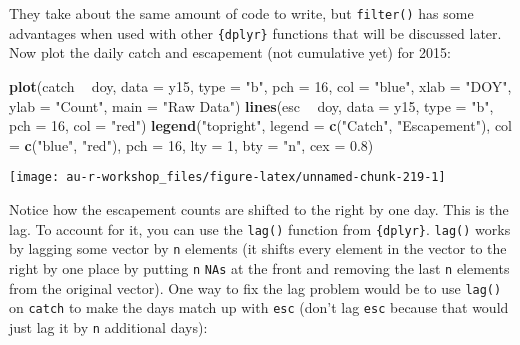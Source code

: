 \documentclass[]{book}
\newenvironment{Shaded}{\begin{snugshade}}{\end{snugshade}}
\newcommand{\KeywordTok}[1]{\textcolor[rgb]{0.13,0.29,0.53}{\textbf{#1}}}
\newcommand{\DataTypeTok}[1]{\textcolor[rgb]{0.13,0.29,0.53}{#1}}
\newcommand{\DecValTok}[1]{\textcolor[rgb]{0.00,0.00,0.81}{#1}}
\newcommand{\FloatTok}[1]{\textcolor[rgb]{0.00,0.00,0.81}{#1}}
\newcommand{\StringTok}[1]{\textcolor[rgb]{0.31,0.60,0.02}{#1}}
\newcommand{\OperatorTok}[1]{\textcolor[rgb]{0.81,0.36,0.00}{\textbf{#1}}}
\newcommand{\NormalTok}[1]{#1}
\theoremstyle{definition}
\theoremstyle{definition}
\theoremstyle{definition}
\theoremstyle{remark}
\begin{document}
They take about the same amount of code to write, but \texttt{filter()}
has some advantages when used with other \texttt{\{dplyr\}} functions
that will be discussed later. Now plot the daily catch and escapement
(not cumulative yet) for 2015:

\begin{Shaded}
\begin{Highlighting}[]
\KeywordTok{plot}\NormalTok{(catch }\OperatorTok{~}\StringTok{ }\NormalTok{doy, }\DataTypeTok{data =}\NormalTok{ y15, }\DataTypeTok{type =} \StringTok{"b"}\NormalTok{, }\DataTypeTok{pch =} \DecValTok{16}\NormalTok{, }\DataTypeTok{col =} \StringTok{"blue"}\NormalTok{,}
     \DataTypeTok{xlab =} \StringTok{"DOY"}\NormalTok{, }\DataTypeTok{ylab =} \StringTok{"Count"}\NormalTok{, }\DataTypeTok{main =} \StringTok{"Raw Data"}\NormalTok{)}
\KeywordTok{lines}\NormalTok{(esc }\OperatorTok{~}\StringTok{ }\NormalTok{doy, }\DataTypeTok{data =}\NormalTok{ y15, }\DataTypeTok{type =} \StringTok{"b"}\NormalTok{, }\DataTypeTok{pch =} \DecValTok{16}\NormalTok{, }\DataTypeTok{col =} \StringTok{"red"}\NormalTok{)}
\KeywordTok{legend}\NormalTok{(}\StringTok{"topright"}\NormalTok{, }\DataTypeTok{legend =} \KeywordTok{c}\NormalTok{(}\StringTok{"Catch"}\NormalTok{, }\StringTok{"Escapement"}\NormalTok{), }
       \DataTypeTok{col =} \KeywordTok{c}\NormalTok{(}\StringTok{"blue"}\NormalTok{, }\StringTok{"red"}\NormalTok{), }\DataTypeTok{pch =} \DecValTok{16}\NormalTok{, }\DataTypeTok{lty =} \DecValTok{1}\NormalTok{, }\DataTypeTok{bty =} \StringTok{"n"}\NormalTok{, }\DataTypeTok{cex =} \FloatTok{0.8}\NormalTok{)}
\end{Highlighting}
\end{Shaded}

\begin{center}\texttt{[image: au-r-workshop\_files/figure-latex/unnamed-chunk-219-1]} \end{center}

Notice how the escapement counts are shifted to the right by one day.
This is the lag. To account for it, you can use the \texttt{lag()}
function from \texttt{\{dplyr\}}. \texttt{lag()} works by lagging some
vector by \texttt{n} elements (it shifts every element in the vector to
the right by one place by putting \texttt{n} \texttt{NAs} at the front
and removing the last \texttt{n} elements from the original vector). One
way to fix the lag problem would be to use \texttt{lag()} on
\texttt{catch} to make the days match up with \texttt{esc} (don't lag
\texttt{esc} because that would just lag it by \texttt{n} additional
days):
\end{document}
